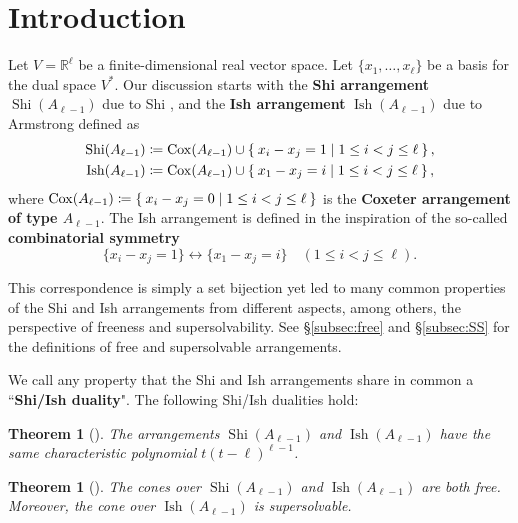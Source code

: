 \documentclass[11pt]{article}
\newtheorem{theorem}[theo]{Theorem}
\theoremstyle{definition}
\numberwithin{equation}{section}
\DeclareMathOperator{\Cox}{Cox}
\DeclareMathOperator{\Shi}{Shi}
\DeclareMathOperator{\Ish}{Ish}
\newcommand{\tbf}{\textbf}
\begin{document}
\section{Introduction}
\quad
Let $V= \mathbb{R}^{\ell} $ be a finite-dimensional real vector space. 
Let $ \{x_{1}, \dots, x_{\ell}\} $ be a basis for the dual space $V^{\ast} $. 
Our discussion starts with the \textbf{Shi arrangement} $ \Shi(A_{\ell-1}) $ due to Shi \cite[Chapter 7]{Shi86},  and the \textbf{Ish arrangement} $ \Ish(A_{\ell-1}) $ due to Armstrong \cite{Arms13} defined as
\begin{equation}
\label{eq:SI}
\begin{aligned}
\Shi(A_{\ell-1}) &\coloneqq\Cox(A_{\ell-1}) \cup  \Set{ x_{i}-x_{j}= 1 | 1 \leq i < j \leq \ell}, \\
 \Ish(A_{\ell-1}) &\coloneqq\Cox(A_{\ell-1}) \cup \Set{ x_{1}-x_{j} = i | 1 \leq i < j \leq \ell},
\end{aligned}
\end{equation}
where $\Cox(A_{\ell-1})  \coloneqq \Set{ x_{i}-x_{j}=0 | 1 \leq i < j \leq \ell} $ is the  \textbf{Coxeter arrangement of type $A_{\ell-1}$}. 
The Ish arrangement is defined in the inspiration of the so-called \textbf{combinatorial symmetry} \cite{AR12} 
\begin{equation}
\label{eq:CS}
\{x_{i}-x_{j}= 1\} \longleftrightarrow \{ x_{1}-x_{j} = i\} \quad (1 \leq i < j \leq \ell).
\end{equation}

This correspondence is simply a set bijection yet led to many common properties of the Shi and Ish arrangements from different aspects, among others, the perspective of freeness and supersolvability. 
See \S\ref{subsec:free} and \S\ref{subsec:SS} for the definitions of free and supersolvable arrangements. 

We call any property that the Shi and Ish arrangements share in common a ``\tbf{Shi/Ish duality}". 
The following Shi/Ish dualities hold: 

\begin{theorem}[\cite{Headley97, A96, Arms13, AR12}]\label{Shi/Ish characteristic polynomial}
The arrangements $\Shi(A_{\ell-1})$ and $\Ish(A_{\ell-1})$ have the same characteristic polynomial $t(t-\ell)^{\ell-1}$. 
\end{theorem}

\begin{theorem}[\cite{Atha98, AST17,Yo04}]\label{Shi/Ish freeness}
The cones over $\Shi(A_{\ell-1})$ and $\Ish(A_{\ell-1})$ are both free. 
Moreover, the cone over $\Ish(A_{\ell-1})$ is supersolvable. 
\end{theorem}
\end{document}
